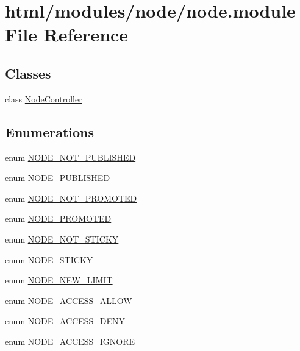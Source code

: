 \hypertarget{node_8module}{
\section{html/modules/node/node.module File Reference}
\label{node_8module}
}
\subsection*{Classes}
\begin{DoxyCompactItemize}
\item 
class \hyperlink{classNodeController}{NodeController}
\end{DoxyCompactItemize}
\subsection*{Enumerations}
\begin{DoxyCompactItemize}
\item 
enum \hyperlink{node_8module_ae89cd87cdf9fef403c8c5df93de39672}{NODE\_\-NOT\_\-PUBLISHED} 
\item 
enum \hyperlink{node_8module_a59b1bca644d4464345020a98baef8824}{NODE\_\-PUBLISHED} 
\item 
enum \hyperlink{node_8module_a779cdc67f5fc4ef57fed00293067f4a7}{NODE\_\-NOT\_\-PROMOTED} 
\item 
enum \hyperlink{node_8module_aa19bda5cfea2bba531f2bb461c71b72f}{NODE\_\-PROMOTED} 
\item 
enum \hyperlink{node_8module_a400a6e3960e60cc27d070d1dd123c9e4}{NODE\_\-NOT\_\-STICKY} 
\item 
enum \hyperlink{node_8module_a90802a9d8cbd9d228e2c40f500548e40}{NODE\_\-STICKY} 
\item 
enum \hyperlink{node_8module_af5fe4efd69d052f89ff8a0cf277081d3}{NODE\_\-NEW\_\-LIMIT} 
\item 
enum \hyperlink{node_8module_a16f564e82cb41ddf7e687beb504073e7}{NODE\_\-ACCESS\_\-ALLOW} 
\item 
enum \hyperlink{node_8module_a1cad8c8efaaa44b3c98e77003786badc}{NODE\_\-ACCESS\_\-DENY} 
\item 
enum \hyperlink{node_8module_a4155eb36a6910c7473f9a15e247a2142}{NODE\_\-ACCESS\_\-IGNORE} 
\end{DoxyCompactItemize}
